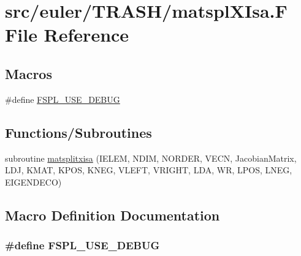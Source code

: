\hypertarget{matspl_x_isa_8_f}{\section{src/euler/\-T\-R\-A\-S\-H/matspl\-X\-Isa.F File Reference}
\label{matspl_x_isa_8_f}
}
\subsection*{Macros}
\begin{DoxyCompactItemize}
\item 
\#define \hyperlink{matspl_x_isa_8_f_ab1b586a7864b1f707bfe11745482f325}{F\-S\-P\-L\-\_\-\-U\-S\-E\-\_\-\-D\-E\-B\-U\-G}
\end{DoxyCompactItemize}
\subsection*{Functions/\-Subroutines}
\begin{DoxyCompactItemize}
\item 
subroutine \hyperlink{matspl_x_isa_8_f_ad86a4c554a7d2ffc9c0869af11666340}{matsplitxisa} (I\-E\-L\-E\-M, N\-D\-I\-M, N\-O\-R\-D\-E\-R, V\-E\-C\-N, Jacobian\-Matrix, L\-D\-J, K\-M\-A\-T, K\-P\-O\-S, K\-N\-E\-G, V\-L\-E\-F\-T, V\-R\-I\-G\-H\-T, L\-D\-A, W\-R, L\-P\-O\-S, L\-N\-E\-G, E\-I\-G\-E\-N\-D\-E\-C\-O)
\end{DoxyCompactItemize}


\subsection{Macro Definition Documentation}
\hypertarget{matspl_x_isa_8_f_ab1b586a7864b1f707bfe11745482f325}{
\subsubsection[{F\-S\-P\-L\-\_\-\-U\-S\-E\-\_\-\-D\-E\-B\-U\-G}]{\setlength{\rightskip}{0pt plus 5cm}\#define F\-S\-P\-L\-\_\-\-U\-S\-E\-\_\-\-D\-E\-B\-U\-G}}\label{matspl_x_isa_8_f_ab1b586a7864b1f707bfe11745482f325}


